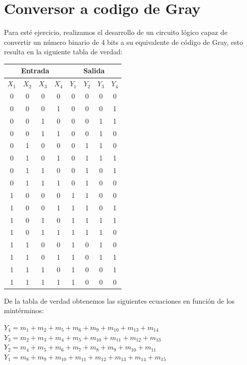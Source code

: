 \section{Conversor a codigo de Gray}
Para esté ejercicio, realizamos el desarrollo de un circuito lógico capaz de convertir un número binario de 4 bits a su equivalente de código de Gray, esto resulta en la siguiente tabla de verdad:
\begin{table}[H]
	\begin{center}
		\begin{tabular}{|c|c|c|c||c|c|c|c|}
			\hline
			\multicolumn{4}{|c||}{Entrada} & \multicolumn{4}{|c|}{Salida}\\
			\hline
			$X_1$ &	$X_2$ &	$X_3$ &	$X_4$ & $Y_1$ & $Y_2$ & $Y_3$ & $Y_4$\\
			\hline
			0 & 0 & 0 & 0 & 0 & 0 & 0 & 0\\
			\hline
			0 & 0 & 0 & 1 & 0 & 0 & 0 & 1\\
			\hline
			0 & 0 & 1 & 0 & 0 & 0 & 1 & 1\\
			\hline
			0 & 0 & 1 & 1 & 0 & 0 & 1 & 0\\
			\hline
			0 & 1 & 0 & 0 & 0 & 1 & 1 & 0\\
			\hline
			0 & 1 & 0 & 1 & 0 & 1 & 1 & 1\\
			\hline
			0 & 1 & 1 & 0 & 0 & 1 & 0 & 1\\
			\hline
			0 & 1 & 1 & 1 & 0 & 1 & 0 & 0\\
			\hline
			1 & 0 & 0 & 0 & 1 & 1 & 0 & 0\\
			\hline
			1 & 0 & 0 & 1 & 1 & 1 & 0 & 1\\
			\hline
			1 & 0 & 1 & 0 & 1 & 1 & 1 & 1\\
			\hline
			1 & 0 & 1 & 1 & 1 & 1 & 1 & 0\\
			\hline
			1 & 1 & 0 & 0 & 1 & 0 & 1 & 0\\
			\hline
			1 & 1 & 0 & 1 & 1 & 0 & 1 & 1\\
			\hline
			1 & 1 & 1 & 0 & 1 & 0 & 0 & 1\\
			\hline
			1 & 1 & 1 & 1 & 1 & 0 & 0 & 0\\
			\hline
		\end{tabular}
	\end{center}
\end{table}
De la tabla de verdad obtenemos las siguientes ecuaciones en función de los mintérminos:
\begin{center}
	$Y_4=m_1+m_2+m_5+m_6+m_9+m_{10}+m_{13}+m_{14}$\\
	$Y_3=m_2+m_3+m_4+m_5+m_{10}+m_{11}+m_{12}+m_{13}$\\
	$Y_2=m_4+m_5+m_6+m_7+m_8+m_9+m_{10}+m_{11}$\\
	$Y_1=m_8+m_9+m_{10}+m_{11}+m_{12}+m_{13}+m_{14}+m_{15}$\\
\end{center}
